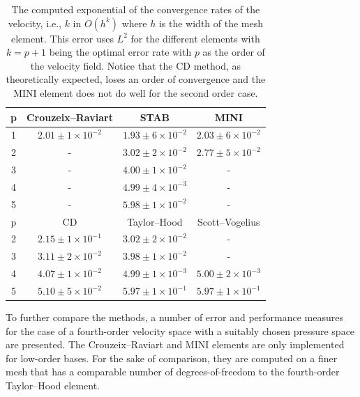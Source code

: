 \begin{table}
  \caption{The computed exponential of the convergence rates of the
  velocity, i.e., $k$ in $O(h^k)$ where $h$ is the width of the mesh
  element. This error uses $L^2$ for the different elements with $k=p+1$
  being the optimal error rate with $p$ as the order of the velocity
  field.  Notice that the CD method, as theoretically expected, loses
  an order of convergence and the MINI element does not do well for the
  second order case. }
  \label{tab:terrel:vel_error}
  \begin{center}
  \small
  \begin{tabular}{|c|ccc|}
    \hline
    p  & Crouzeix--Raviart &  STAB &  MINI \\
\hline
   1 & $2.01\pm 1 \times 10^{-2}$ & $1.93\pm 6 \times 10^{-2}$ & $2.03\pm 6 \times 10^{-2}$ \\
   2 & -                          & $3.02\pm 2 \times 10^{-2}$ & $2.77\pm 5 \times 10^{-2}$ \\
   3 & -                          & $4.00\pm 1 \times 10^{-2}$ & - \\
   4 & -                          & $4.99\pm 4 \times 10^{-3}$ & - \\
   5 & -                          & $5.98\pm 1 \times 10^{-2}$ & -\\
    \hline
    \hline
    p  &  CD  & Taylor--Hood & Scott--Vogelius \\
\hline
   2 & $2.15 \pm 1 \times 10^{-1}$ & $3.02 \pm 2 \times 10^{-2}$ & -  \\
   3 & $3.11 \pm 2 \times 10^{-2}$ & $3.98 \pm 1 \times 10^{-2}$ & -  \\
   4 & $4.07 \pm 1 \times 10^{-2}$ & $4.99 \pm 1 \times 10^{-3}$ & $5.00 \pm 2 \times 10^{-3}$\\
   5 & $5.10 \pm 5 \times 10^{-2}$ & $5.97 \pm 1 \times 10^{-1}$ & $5.97 \pm 1 \times 10^{-1}$\\
    \hline
   \end{tabular}
  \end{center}
\end{table}

To further compare the methods, a number of error and performance measures
for the case of a fourth-order velocity space with a suitably chosen
pressure space are presented. The Crouzeix--Raviart and MINI elements
are only implemented for low-order bases. For the sake of comparison,
they are computed on a finer mesh that has a comparable number of
degrees-of-freedom to the fourth-order Taylor--Hood element.

